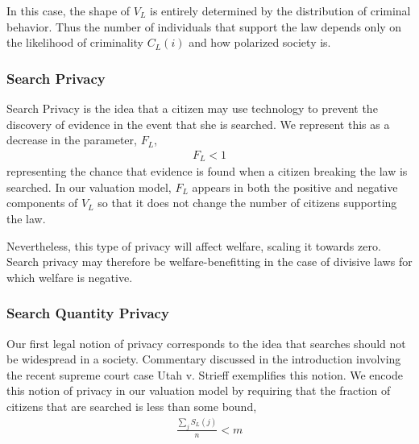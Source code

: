In this case, the shape of $V_L$ is entirely determined by the distribution of criminal behavior. Thus the number of individuals that support the law depends only on the likelihood of criminality $C_L(i)$ and how polarized society is.

\subsubsection{Search Privacy}

Search Privacy is the idea that a citizen may use technology to prevent the discovery of evidence in the event that she is searched.  We represent this as a decrease in the parameter, $F_L$, 
\begin{align}
F_L<1
\end{align}
representing the chance that evidence is found when a citizen breaking the law is searched.  In our valuation model, $F_L$ appears in both the positive and negative components of $V_L$ so that it does not change the number of citizens supporting the law. 

Nevertheless, this type of privacy will affect welfare, scaling it towards zero.  Search privacy may therefore be welfare-benefitting in the case of divisive laws for which welfare is negative.

\subsubsection{Search Quantity Privacy}

Our first legal notion of privacy corresponds to the idea that searches should not be widespread in a society.  Commentary discussed in the introduction involving  the recent supreme court case Utah v. Strieff exemplifies this notion.
%
We encode this notion of privacy in our valuation model by requiring that the fraction of citizens that are searched is less than some bound, 
\begin{align}
\frac{\sum_j S_L(j)}{n} < m
\end{align}

